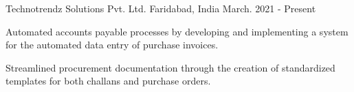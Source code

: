 

\begin{cventries}

  \cventry
    {} %
    {Technotrendz Solutions Pvt. Ltd.} %
    {Faridabad, India} %
    {March. 2021 - Present} %
    {
      \begin{cvitems} %
        \item {Automated accounts payable processes by developing and implementing a system for the automated data entry of purchase invoices.}
        \item {Streamlined procurement documentation through the creation of standardized templates for both challans and purchase orders.}
      \end{cvitems}
    }
\end{cventries}
